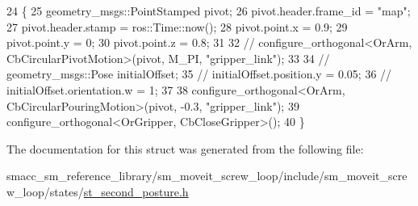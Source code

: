 \begin{DoxyCode}
24         \{
25             geometry\_msgs::PointStamped pivot;
26             pivot.header.frame\_id = \textcolor{stringliteral}{"map"};
27             pivot.header.stamp = ros::Time::now();
28             pivot.point.x = 0.9;
29             pivot.point.y = 0;
30             pivot.point.z = 0.8;
31 
32             \textcolor{comment}{// configure\_orthogonal<OrArm, CbCircularPivotMotion>(pivot, M\_PI, "gripper\_link");}
33 
34             \textcolor{comment}{// geometry\_msgs::Pose initialOffset;}
35             \textcolor{comment}{// initialOffset.position.y = 0.05;}
36             \textcolor{comment}{// initialOffset.orientation.w = 1;}
37 
38             configure\_orthogonal<OrArm, CbCircularPouringMotion>(pivot, -0.3, \textcolor{stringliteral}{"gripper\_link"});
39             configure\_orthogonal<OrGripper, CbCloseGripper>();
40         \}
\end{DoxyCode}


The documentation for this struct was generated from the following file\+:\begin{DoxyCompactItemize}
\item 
smacc\+\_\+sm\+\_\+reference\+\_\+library/sm\+\_\+moveit\+\_\+screw\+\_\+loop/include/sm\+\_\+moveit\+\_\+screw\+\_\+loop/states/\hyperlink{st__second__posture_8h}{st\+\_\+second\+\_\+posture.\+h}\end{DoxyCompactItemize}
